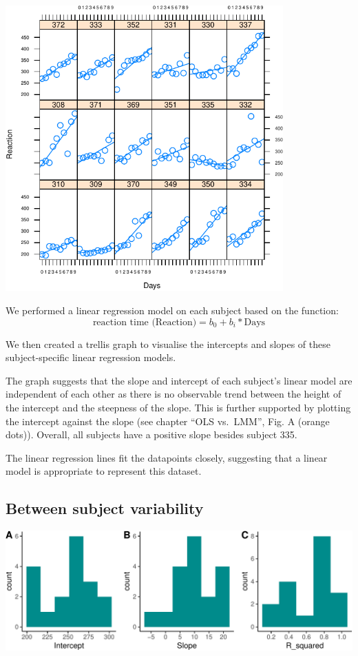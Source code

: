 \documentclass[
]{article}
\begin{document}
\begin{center}\includegraphics[width=0.8\textwidth]{common_sleep_files/figure-latex/trellis-1} \end{center}

We performed a linear regression model on each subject based on the
function: \[\text{reaction time (Reaction)} = b_0 + b_i* \text{Days}\]

We then created a trellis graph to visualise the intercepts and slopes
of these subject-specific linear regression models.

The graph suggests that the slope and intercept of each subject's linear
model are independent of each other as there is no observable trend
between the height of the intercept and the steepness of the slope. This
is further supported by plotting the intercept against the slope (see
chapter ``OLS vs.~LMM'', Fig. A (orange dots)). Overall, all subjects
have a positive slope besides subject 335.

The linear regression lines fit the datapoints closely, suggesting that
a linear model is appropriate to represent this dataset.

\hypertarget{between-subject-variability}{%
\subsection{Between subject
variability}\label{between-subject-variability}}

\begin{center}\includegraphics{common_sleep_files/figure-latex/unnamed-chunk-3-1} \end{center}
\end{document}
